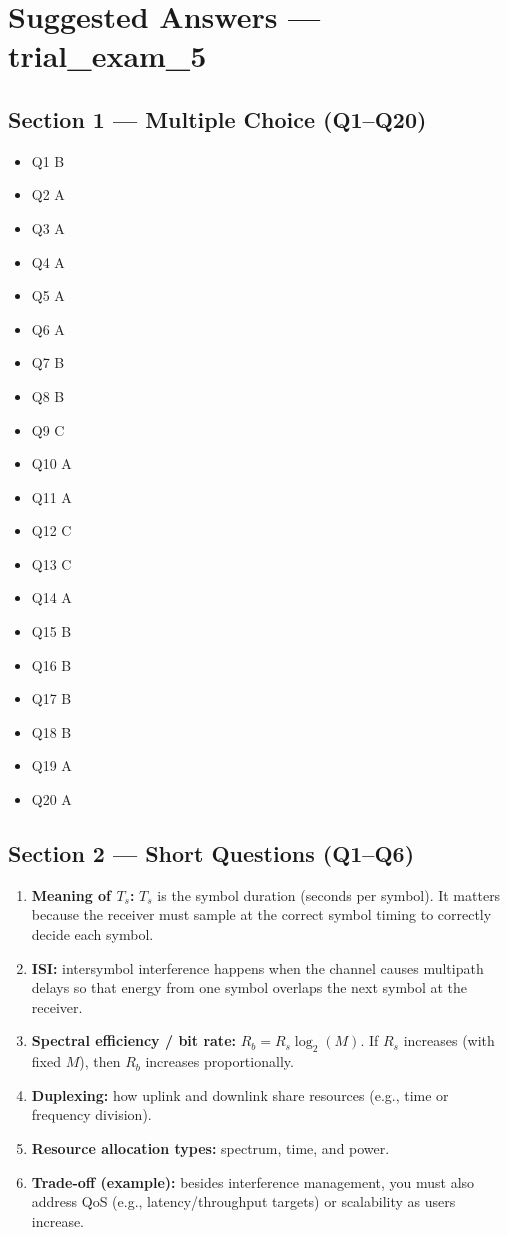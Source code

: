 \documentclass[11pt,a4paper]{article}
\begin{document}
\section*{Suggested Answers --- trial\_exam\_5}

\subsection*{Section 1 --- Multiple Choice (Q1--Q20)}
\begin{itemize}
    \item Q1 B
    \item Q2 A
    \item Q3 A
    \item Q4 A
    \item Q5 A
    \item Q6 A
    \item Q7 B
    \item Q8 B
    \item Q9 C
    \item Q10 A
    \item Q11 A
    \item Q12 C
    \item Q13 C
    \item Q14 A
    \item Q15 B
    \item Q16 B
    \item Q17 B
    \item Q18 B
    \item Q19 A
    \item Q20 A
\end{itemize}

\subsection*{Section 2 --- Short Questions (Q1--Q6)}
\begin{enumerate}[label=\arabic*.]
    \item \textbf{Meaning of $T_s$:} $T_s$ is the symbol duration (seconds per symbol). It matters because the receiver must sample at the correct symbol timing to correctly decide each symbol.
    \item \textbf{ISI:} intersymbol interference happens when the channel causes multipath delays so that energy from one symbol overlaps the next symbol at the receiver.
    \item \textbf{Spectral efficiency / bit rate:} $R_b=R_s\log_2(M)$. If $R_s$ increases (with fixed $M$), then $R_b$ increases proportionally.
    \item \textbf{Duplexing:} how uplink and downlink share resources (e.g., time or frequency division).
    \item \textbf{Resource allocation types:} spectrum, time, and power.
    \item \textbf{Trade-off (example):} besides interference management, you must also address QoS (e.g., latency/throughput targets) or scalability as users increase.
\end{enumerate}
\end{document}
